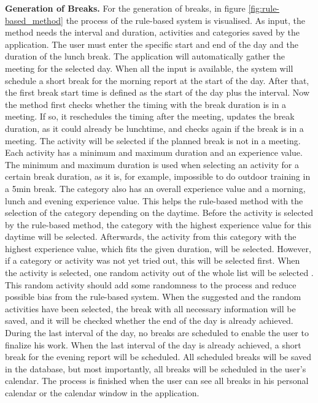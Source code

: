 \documentclass{hasel_thesis}
\begin{document}
\textbf{Generation of Breaks.} For the generation of breaks, in figure \ref{fig:rule-based_method} the process of the rule-based system is visualised. As input, the method needs the interval and duration, activities and categories saved by the application. The user must enter the specific start and end of the day and the duration of the lunch break. The application will automatically gather the meeting for the selected day. When all the input is available, the system will schedule a short break for the morning report at the start of the day. After that, the first break start time is defined as the start of the day plus the interval. Now the method first checks whether the timing with the break duration is in a meeting. If so, it reschedules the timing after the meeting, updates the break duration, as it could already be lunchtime, and checks again if the break is in a meeting. The activity will be selected if the planned break is not in a meeting. Each activity has a minimum and maximum duration and an experience value. The minimum and maximum duration is used when selecting an activity for a certain break duration, as it is, for example, impossible to do outdoor training in a 5min break. The category also has an overall experience value and a morning, lunch and evening experience value. This helps the rule-based method with the selection of the category depending on the daytime. Before the activity is selected by the rule-based method, the category with the highest experience value for this daytime will be selected. Afterwards, the activity from this category with the highest experience value, which fits the given duration, will be selected. However, if a category or activity was not yet tried out, this will be selected first. When the activity is selected, one random activity out of the whole list will be selected . This random activity should add some randomness to the process and reduce possible bias from the rule-based system. When the suggested and the random activities have been selected, the break with all necessary information will be saved, and it will be checked whether the end of the day is already achieved. During the last interval of the day, no breaks are scheduled to enable the user to finalize his work. When the last interval of the day is already achieved, a short break for the evening report will be scheduled. All scheduled breaks will be saved in the database, but most importantly, all breaks will be scheduled in the user's calendar. The process is finished when the user can see all breaks in his personal calendar or the calendar window in the application.
\end{document}

